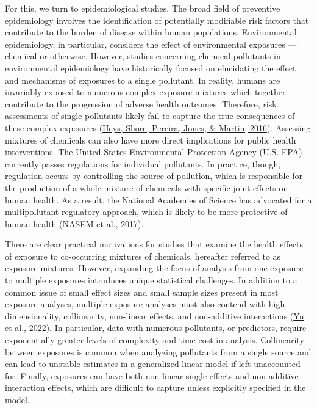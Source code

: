 \documentclass[12pt, twoside]{amherstthesis}
\begin{document}
For this, we turn to epidemiological studies. The broad field of preventive epidemiology involves the identification of potentially modifiable risk factors that contribute to the burden of disease within human populations. Environmental epidemiology, in particular, considers the effect of environmental exposures --- chemical or otherwise. However, studies concerning chemical pollutants in environmental epidemiology have historically focused on elucidating the effect and mechanisms of exposures to a single pollutant. In reality, humans are invariably exposed to numerous complex exposure mixtures which together contribute to the progression of adverse health outcomes. Therefore, risk assessments of single pollutants likely fail to capture the true consequences of these complex exposures (\protect\hyperlink{ref-heys_risk_2016}{Heys, Shore, Pereira, Jones, \& Martin, 2016}). Assessing mixtures of chemicals can also have more direct implications for public health interventions. The United States Environmental Protection Agency (U.S. EPA) currently passes regulations for individual pollutants. In practice, though, regulation occurs by controlling the source of pollution, which is responsible for the production of a whole mixture of chemicals with specific joint effects on human health. As a result, the National Academies of Science has advocated for a multipollutant regulatory approach, which is likely to be more protective of human health (NASEM et al., \protect\hyperlink{ref-national_academies_of_sciences_engineering_and_medicine_using_2017}{2017}).

There are clear practical motivations for studies that examine the health effects of exposure to co-occurring mixtures of chemicals, hereafter referred to as exposure mixtures. However, expanding the focus of analysis from one exposure to multiple exposures introduces unique statistical challenges. In addition to a common issue of small effect sizes and small sample sizes present in most exposure analyses, multiple exposure analyses must also contend with high-dimensionality, collinearity, non-linear effects, and non-additive interactions (\protect\hyperlink{ref-yu_review_2022}{Yu et al., 2022}). In particular, data with numerous pollutants, or predictors, require exponentially greater levels of complexity and time cost in analysis. Collinearity between exposures is common when analyzing pollutants from a single source and can lead to unstable estimates in a generalized linear model if left unaccounted for. Finally, exposures can have both non-linear single effects and non-additive interaction effects, which are difficult to capture unless explicitly specified in the model.
\end{document}
